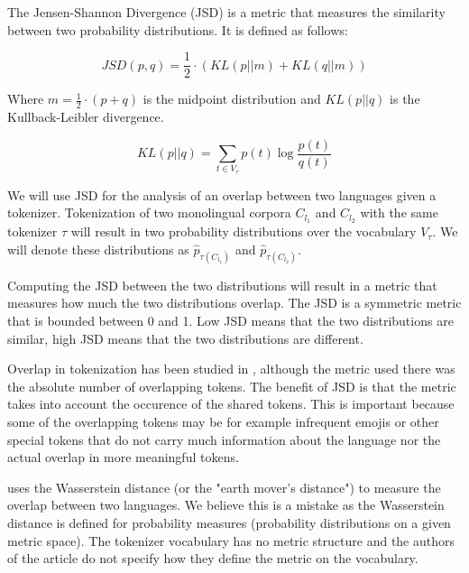 The Jensen-Shannon Divergence (JSD) is a metric that measures the similarity between two probability distributions. It is defined as follows:

\begin{equation}
    JSD(p, q) = \frac{1}{2} \cdot (KL(p||m) + KL(q||m))
\end{equation}

Where $m = \frac{1}{2} \cdot (p + q)$ is the midpoint distribution and $KL(p||q)$ is the Kullback-Leibler divergence. 

\begin{equation}
    KL(p||q) = \sum_{t \in V_\tau} p(t) \log \frac{p(t)}{q(t)}
\end{equation}

We will use JSD for the analysis of an overlap between two languages given a tokenizer. Tokenization of two monolingual corpora $C_{l_1}$ and $C_{l_2}$ with the same tokenizer $\tau$ will result in two probability distributions over the vocabulary $V_\tau$. We will denote these distributions as $\hat{p}_{\tau(C_{l_1})}$ and $\hat{p}_{\tau(C_{l_2})}$. 

Computing the JSD between the two distributions will result in a metric that measures how much the two distributions overlap. The JSD is a symmetric metric that is bounded between 0 and 1. Low JSD means that the two distributions are similar, high JSD means that the two distributions are different. 

Overlap in tokenization has been studied in \citet{wu_beto_2019}, although the metric used there was the absolute number of overlapping tokens. The benefit of JSD is that the metric takes into account the occurence of the shared tokens. This is important because some of the overlapping tokens may be for example infrequent emojis or other special tokens that do not carry much information about the language nor the actual overlap in more meaningful tokens.

\citet{chung_improving_2020} uses the Wasserstein distance (or the "earth mover's distance") to measure the overlap between two languages. We believe this is a mistake as the Wasserstein distance is defined for probability measures (probability distributions on a given metric space). The tokenizer vocabulary has no metric structure and the authors of the article do not specify how they define the metric on the vocabulary.


